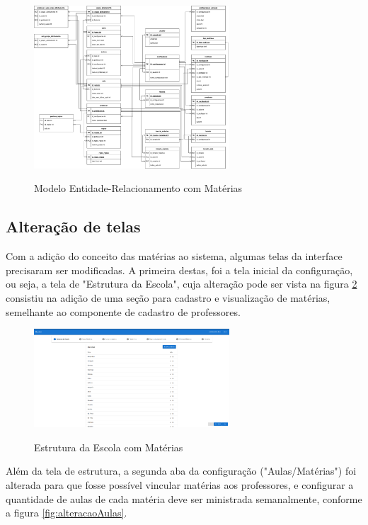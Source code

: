 \begin{figure}[!htb]
	\centering
	\caption{Modelo Entidade-Relacionamento com Matérias}
	\includegraphics[width=0.65\textwidth]{./dados/figuras/er_materias}
	\label{fig:modelagemMateiras}
\end{figure}
\pagebreak

\subsection{Alteração de telas}
Com a adição do conceito das matérias ao sistema, algumas telas da interface precisaram ser modificadas. A primeira destas, foi a tela inicial da configuração, ou seja, a tela de "Estrutura da Escola", cuja alteração pode ser vista na figura \ref{fig:estruturaAtualizada} consistiu na adição de uma seção para cadastro e visualização de matérias, semelhante ao componente de cadastro de professores.

\begin{figure}[!htb]
	\centering
	\caption{Estrutura da Escola com Matérias}
	\includegraphics[width=0.65\textwidth]{./dados/figuras/alteracaoEstrutura}
	\label{fig:estruturaAtualizada}
\end{figure}
\pagebreak

Além da tela de estrutura, a segunda aba da configuração ("Aulas/Matérias") foi alterada para que fosse possível vincular matérias aos professores, e configurar a quantidade de aulas de cada matéria deve ser ministrada semanalmente, conforme a figura \ref{fig:alteracaoAulas}.

